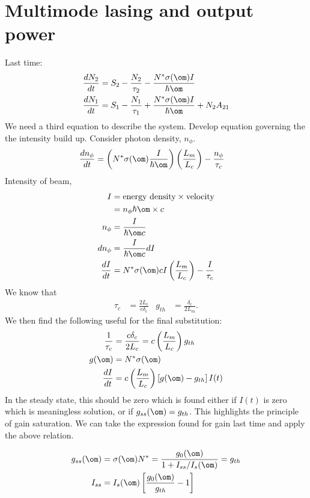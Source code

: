 \documentclass[a4paper, 11pt, normalem]{report}
\begin{document}
\chapter{Multimode lasing and output power}
Last time:
\begin{align}
    \frac{dN_2}{dt} &= S_2 - \frac{N_2}{\tau_2} - \frac{N^*\sigma(\om)I}{\hbar\om} \\
    \frac{dN_1}{dt} &= S_1 - \frac{N_1}{\tau_1} + \frac{N^*\sigma(\om)I}{\hbar\om} + N_2A_{21} 
\end{align}
We need a third equation to describe the system.
Develop equation governing the the intensity build up. 
Consider photon density, $n_\phi$.
\begin{align}
    \frac{dn_\phi}{dt} &= \left(N^*\sigma(\om)\frac{I}{\hbar\om}\right)\left(\frac{L_m}{L_c}\right) - \frac{n_\phi}{\tau_c}
\end{align}
Intensity of beam, 
\begin{align}
    I &= \text{energy density}\times\text{velocity} \\
      &= n_\phi\hbar\om\times c \\
    n_\phi &= \frac{I}{\hbar\om c} \\
    dn_\phi &= \frac{I}{\hbar\om c}dI \\
    \frac{dI}{dt} &= N^*\sigma(\om)cI\left(\frac{L_m}{L_c}\right)-\frac{I}{\tau_c}
\end{align}
We know that
\begin{align}
    \tau_c &= \frac{2L_c}{c\delta_c} & g_{th} &= \frac{\delta_c}{2L_m}.
\end{align}
We then find the following useful for the final substitution:
\begin{align}
    \frac{1}{\tau_c} &= \frac{c\delta_c}{2L_c} = c\left(\frac{L_m}{L_c}\right)g_{th} \\
    g(\om) &= N^*\sigma(\om) \\
    \frac{dI}{dt} &= c\left(\frac{L_m}{L_c}\right)\left[g(\om) - g_{th}\right]I(t)
\end{align}
In the steady state, this should be zero which is found either if $I(t)$ is zero which is meaningless solution, or if $g_{ss}(\om) = g_{th}$.
This highlights the principle of gain saturation.
We can take the expression found for gain last time and apply the above relation.
\begin{multicols}{2}
\begin{figure}[H]
    \centering
\end{figure}
\begin{align}
    g_{ss}(\om) &= \sigma(\om)N^* = \frac{g_0(\om)}{1+I_{ss}/I_s(\om)} = g_{th} \\
    I_{ss} &= I_s(\om)\left[\frac{g_0(\om)}{g_{th}}-1\right]
\end{align}
\end{multicols}
\end{document}
